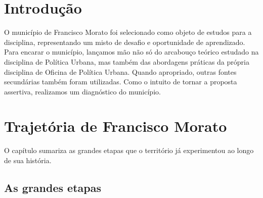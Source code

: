 	

	\tableofcontents 
	\newpage \listoffigures
	\newpage \listoftables
	\textual


%
%

%
%
	
	\chapter{Introdução}

	O município de Francisco Morato foi selecionado como objeto de estudos para a disciplina, representando um misto de desafio e oportunidade de aprendizado. Para encarar o município, lançamos mão não só do arcabouço teórico estudado na disciplina de Política Urbana, mas também das abordagens práticas da própria disciplina de Oficina de Política Urbana. Quando apropriado, outras fontes secundárias também foram utilizadas. Como o intuito de tornar a proposta assertiva, realizamos um diagnóstico do município.
	
	\chapter{Trajetória de Francisco Morato}
	
	O capítulo sumariza as grandes etapas que o território já experimentou ao longo de sua história.
	
	\section{As grandes etapas}
	
